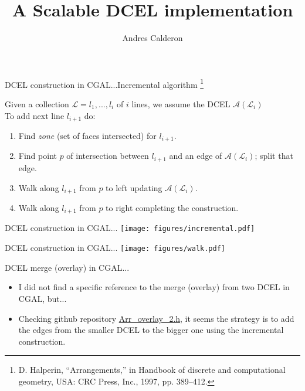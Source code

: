 \documentclass{beamer}
\makeatletter
\newcommand\makebeamertitle{\frame{\maketitle}}%
\let\origtableofcontents=\tableofcontents
\def\tableofcontents{\@ifnextchar[{\origtableofcontents}{\gobbletableofcontents}}
\def\gobbletableofcontents#1{\origtableofcontents}
\makeatother
\begin{document}
\title[DDCEL report]{A Scalable DCEL implementation}
\author[AC]{Andres Calderon}
\makebeamertitle
\newif\iflattersubsect


\AtBeginSubsection[] {
  \begin{frame}<beamer>
    \frametitle{Outline} 
    \tableofcontents[currentsubsection]  
  \end{frame}
}

\begin{frame}{DCEL construction in CGAL...}{Incremental algorithm \footnote{\tiny{D. Halperin, “Arrangements,” in Handbook of discrete and computational geometry, USA: CRC Press, Inc., 1997, pp. 389–412.}}}

Given a collection $\mathcal{L}={l_1,...,l_i}$ of $i$ lines, we assume the DCEL $\mathcal{A}(\mathcal{L}_i)$ \\
To add next line $l_{i+1}$ do:
    \begin{enumerate}
        \item Find \textit{zone} (set of faces intersected) for $l_{i+1}$.
        \item Find point $p$ of intersection between $l_{i+1}$ and an edge of $\mathcal{A}(\mathcal{L}_i)$; split that edge.
        \item Walk along $l_{i+1}$ from $p$ to left updating $\mathcal{A}(\mathcal{L}_i)$.
        \item Walk along $l_{i+1}$ from $p$ to right completing the construction.
    \end{enumerate}
\end{frame}

\begin{frame}{DCEL construction in CGAL...}
    \centering 
    \texttt{[image: figures/incremental.pdf]}
\end{frame}

\begin{frame}{DCEL construction in CGAL...}
    \centering 
    \texttt{[image: figures/walk.pdf]}
\end{frame}

\begin{frame}{DCEL merge (overlay) in CGAL...}
    \begin{itemize}
        \item I did not find a specific reference to the merge (overlay) from two DCEL in CGAL, but...
        \item Checking github repository \href{https://tinyurl.com/5cc7w7t3}{Arr\_overlay\_2.h}, it seems the strategy is to add the edges from the smaller DCEL to the bigger one using the incremental construction. 
    \end{itemize}

\end{frame}
\end{document}
